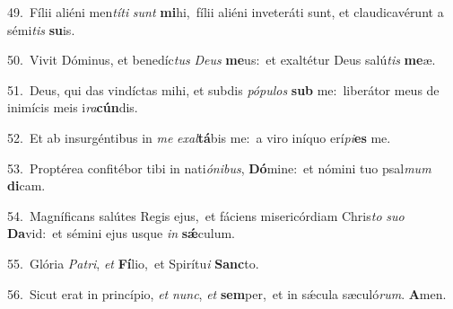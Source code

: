 {\numbfont\textcolor{\numbcolor}{49.}}~Fílii aliéni men\-\textit{tí}\-\textit{ti} \textit{sunt} \textbf{mi}\-hi,~\star fílii aliéni inveteráti sunt, et claudicavérunt a sémi\textit{tis} \textbf{su}\-is.\par
{\numbfont\textcolor{\numbcolor}{50.}}~Vivit Dóminus, et benedíc\textit{tus} \textit{De}\-\textit{us} \textbf{me}\-us:~\star et exaltétur Deus salú\textit{tis} \textbf{me}\-æ.\par
{\numbfont\textcolor{\numbcolor}{51.}}~Deus, qui das vindíctas mihi, et subdis \textit{pó}\-\textit{pu}\textit{los} \textbf{sub} me:~\star liberátor meus de inimícis meis i\-\textit{ra}\-\textbf{cún}dis.\par
{\numbfont\textcolor{\numbcolor}{52.}}~Et ab insurgéntibus in \textit{me} \textit{ex}\-\textit{al}\textbf{tá}bis me:~\star a viro iníquo erí\-\textit{pi}\-\textbf{es} me.\par
{\numbfont\textcolor{\numbcolor}{53.}}~Proptérea confitébor tibi in nati\-\textit{ó}\-\textit{ni}\textit{bus}, \textbf{Dó}\-mine:~\star et nómini tuo psal\textit{mum} \textbf{di}\-cam.\par
{\numbfont\textcolor{\numbcolor}{54.}}~Magníficans salútes Regis ejus,~\dagger et fáciens misericórdiam Chris\textit{to} \textit{su}\-\textit{o} \textbf{Da}\-vid:~\star et sémini ejus usque \textit{in} \textbf{sǽ}\-culum.\par
{\numbfont\textcolor{\numbcolor}{55.}}~Glória \textit{Pa}\-\textit{tri}, \textit{et} \textbf{Fí}\-lio,~\star et Spirítu\textit{i} \textbf{Sanc}\-to.\par
{\numbfont\textcolor{\numbcolor}{56.}}~Sicut erat in princípio, \textit{et} \textit{nunc}\-, \textit{et} \textbf{sem}\-per,~\star et in sǽcula sæculó\-\textit{rum}\-. \textbf{A}\-men.\par
